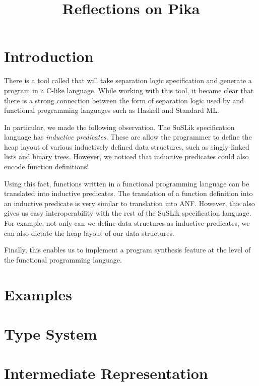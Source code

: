 \documentclass[runningheads]{llncs}
\begin{document}
\title{Reflections on Pika}
\maketitle

\section{Introduction}

There is a tool called \SuSLik{} that will take separation logic specification and generate
a program in a C-like language. While working with this tool, it became clear that there is a strong
connection between the form of separation logic used by \SuSLik{} and functional programming languages such as Haskell and Standard ML.

In particular, we made the following observation. The SuSLik specification language has \textit{inductive predicates}. These are
allow the programmer to define the heap layout of various inductively defined data structures, such as singly-linked lists and binary trees.
However, we noticed that inductive predicates could also encode function definitions!

Using this fact, functions written in a functional programming language can be translated into inductive predicates. The translation
of a function definition into an inductive predicate is very similar to translation into ANF. However, this also gives us easy
interoperability with the rest of the SuSLik specification language. For example, not only can we define data structures as inductive
predicates, we can also dictate the heap layout of our data structures.

Finally, this enables us to implement a program synthesis feature at the level of the functional programming language.

\section{Examples}



\section{Type System}

\section{Intermediate Representation}
\end{document}

